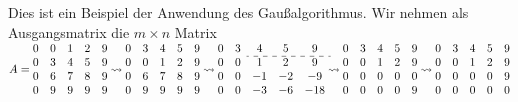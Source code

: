 Dies ist ein Beispiel der Anwendung des Gaußalgorithmus.
Wir nehmen als  Ausgangsmatrix die $m\times n$ Matrix 
$
A=\begin{matrix}
0 & 0 & 1 & 2 & 9 \\ 
0 & 3 & 4 & 5 & 9 \\ 
0 & 6 & 7 & 8 & 9 \\ 
0 & 9 & 9 & 9 & 9
\end{matrix} 
\leadsto
\begin{matrix}
0 & 3 & 4 & 5 & 9 \\ 
0 & 0 & 1 & 2 & 9 \\ 
0 & 6 & 7 & 8 & 9 \\ 
0 & 9 & 9 & 9 & 9
\end{matrix}
\leadsto 
\begin{matrix}
 0 & 3 & 4 & 5 & 9 \\ \cdashline{3-5}
 0 & 0 & 1 & 2 & 9 \\ 
 0 & 0 & -1 & -2 & -9 \\ 
 0 & 0 & -3 & -6 & -18
\end{matrix}
\leadsto
\begin{matrix}
  0 & 3 & 4 & 5 & 9 \\ 
  0 & 0 & 1 & 2 & 9 \\ 
  0 & 0 & 0 & 0 & 0 \\ 
  0 & 0 & 0 & 0 & 9
  \end{matrix}
\leadsto
\begin{matrix}
  0 & 3 & 4 & 5 & 9 \\ 
  0 & 0 & 1 & 2 & 9 \\ 
  0 & 0 & 0 & 0 & 9 \\ 
  0 & 0 & 0 & 0 & 0
 \end{matrix}   $
